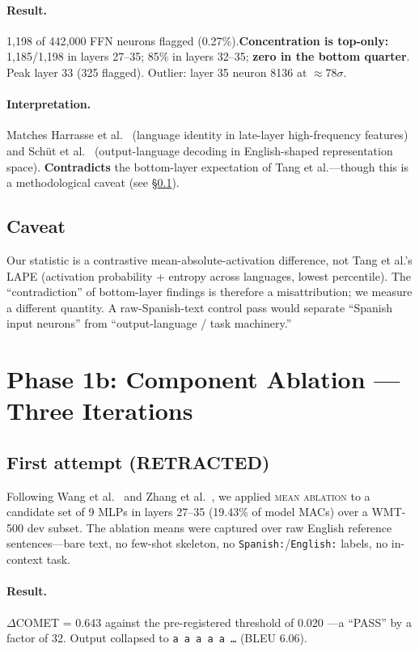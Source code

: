 \documentclass[11pt,a4paper]{article}
\newcommand{\method}[1]{\textsc{#1}}
\begin{document}
\paragraph{Result.} 1,198 of 442,000 FFN neurons flagged (0.27\%).\textbf{Concentration is
top-only:} 1,185/1,198 in layers 27--35; 85\% in layers 32--35; \textbf{zero in the
bottom quarter}. Peak layer 33 (325 flagged). Outlier: layer 35 neuron 8136 at $\approx78\sigma$.

\paragraph{Interpretation.} Matches Harrasse et al.~\cite{harasse} (language identity in
late-layer high-frequency features) and Sch\"ut et al.~\cite{schut} (output-language
decoding in English-shaped representation space). \textbf{Contradicts} the bottom-layer
expectation of Tang et al.---though this is a methodological caveat (see \S\ref{sec:1a-caveat}).

\subsection{Caveat}\label{sec:1a-caveat}
Our statistic is a contrastive mean-absolute-activation difference, not Tang et al.'s
LAPE (activation probability + entropy across languages, lowest percentile).
The ``contradiction'' of bottom-layer findings is therefore a misattribution; we
measure a different quantity. A raw-Spanish-text control pass would separate ``Spanish
input neurons'' from ``output-language / task machinery.''

\section{Phase 1b: Component Ablation --- Three Iterations}

\subsection{First attempt (RETRACTED)}

Following Wang et al.~\cite{ioi} and Zhang et al.~\cite{zhang2025}, we applied
\method{mean ablation} to a candidate set of 9 MLPs in layers 27--35 (19.43\% of model
MACs) over a WMT-500 dev subset. The ablation means were captured over raw English
reference sentences---bare text, no few-shot skeleton, no \texttt{Spanish:}/\texttt{English:}
labels, no in-context task.

\paragraph{Result.} $\Delta$COMET = 0.643 against the pre-registered threshold of 0.020
---a ``PASS'' by a factor of 32. Output collapsed to \texttt{a a a a a \dots} (BLEU 6.06).
\end{document}
